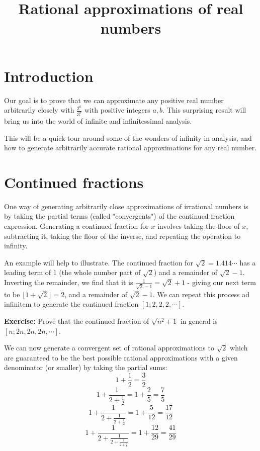 \documentclass{article}
\begin{document}
\title{Rational approximations of real numbers}

\maketitle

\section{Introduction}

Our goal is to prove that we can approximate any positive real number arbitrarily closely
with $\frac{2^a}{3^b}$ with positive integers $a,b$. This surprising result will bring us
into the world of infinite and infinitessimal analysis.

This will be a quick tour around some of the wonders of infinity in analysis, and how to
generate arbitrarily accurate rational approximations for any real number.

\section{Continued fractions}

One way of generating arbitrarily close approximations of irrational numbers is by taking
the partial terms (called "convergents") of the continued fraction expression. Generating
a continued fraction for $x$ involves taking the floor of $x$, subtracting it, taking the
floor of the inverse, and repeating the operation to infinity.

An example will help to illustrate. The continued fraction for $\sqrt{2} = 1.414\cdots$ has
a leading term of 1 (the whole number part of $\sqrt{2}$) and a remainder of $\sqrt{2}-1$.
Inverting the remainder, we find that it is $\frac{1}{\sqrt{2}-1} = \sqrt{2}+1$ - giving
our next term to be $\lfloor 1+\sqrt{2}\rfloor = 2$, and a remainder of $\sqrt{2}-1$.
We can repeat this process ad infinitem to generate the continued fraction 
$\left[1;2,2,2,\cdots\right]$.

\textbf{Exercise:} Prove that the continued fraction of $\sqrt{n^2+1}$ in general is 
$\left[n;2n,2n,2n,\cdots\right]$.

We can now generate a convergent set of rational approximations to $\sqrt{2}$ which are
guaranteed to be the best possible rational approximations with a given denominator (or
smaller) by taking the partial sums:
\[ 1+\frac{1}{2} = \frac{3}{2}\]
\[ 1+\frac{1}{2+\frac{1}{2}} = 1+\frac{2}{5} = \frac{7}{5} \]
\[ 1+\frac{1}{2+\frac{1}{2+\frac{1}{2}}} = 1+\frac{5}{12} = \frac{17}{12} \]
\[ 1+\frac{1}{2+\frac{1}{2+\frac{1}{2 + \frac{1}{2}}}} = 1+\frac{12}{29} = \frac{41}{29} \]
\end{document}
